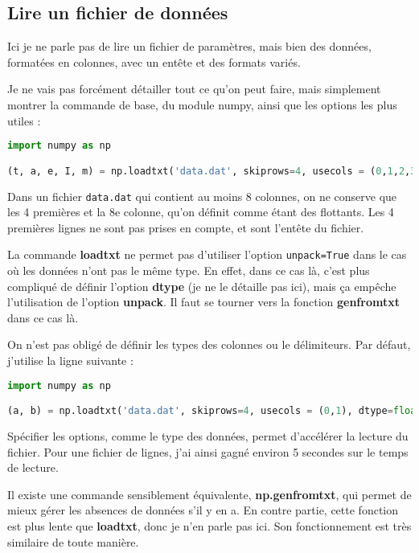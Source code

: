 \documentclass[a4paper,twoside]{article}
\begin{document}
\subsection{Lire un fichier de données}
Ici je ne parle pas de lire un fichier de paramètres, mais bien des données, formatées en colonnes, avec un entête et des formats variés. 

Je ne vais pas forcément détailler tout ce qu'on peut faire, mais simplement montrer la commande de base, du module numpy, ainsi que les options les plus utiles : 
\begin{lstlisting}[language=python]
import numpy as np

(t, a, e, I, m) = np.loadtxt('data.dat', skiprows=4, usecols = (0,1,2,3,7), dtype=float, unpack=True)
\end{lstlisting}
Dans un fichier \texttt{data.dat} qui contient au moins 8 colonnes, on ne conserve que les 4 premières et la 8e colonne, qu'on définit comme étant des flottants. Les 4 premières lignes ne sont pas prises en compte, et sont l'entête du fichier.

\begin{attention}
La commande \textbf{loadtxt} ne permet pas d'utiliser l'option \texttt{unpack=True} dans le cas où les données n'ont pas le même type. En effet, dans ce cas là, c'est plus compliqué de définir l'option \textbf{dtype} (je ne le détaille pas ici), mais ça empêche l'utilisation de l'option \textbf{unpack}. Il faut se tourner vers la fonction \textbf{genfromtxt} dans ce cas là.
\end{attention}


On n'est pas obligé de définir les types des colonnes ou le délimiteurs. Par défaut, j'utilise la ligne suivante : 
\begin{lstlisting}[language=python]
import numpy as np

(a, b) = np.loadtxt('data.dat', skiprows=4, usecols = (0,1), dtype=float, unpack=True)
\end{lstlisting}

\begin{remarque}
Spécifier les options, comme le type des données, permet d'accélérer la lecture du fichier. Pour une fichier de  lignes, j'ai ainsi gagné environ 5 secondes sur le temps de lecture.
\end{remarque}

\bigskip

Il existe une commande sensiblement équivalente, \textbf{np.genfromtxt}, qui permet de mieux gérer les absences de données s'il y en a. En contre partie, cette fonction est plus lente que \textbf{loadtxt}, donc je n'en parle pas ici. Son fonctionnement est très similaire de toute manière.
\end{document}
